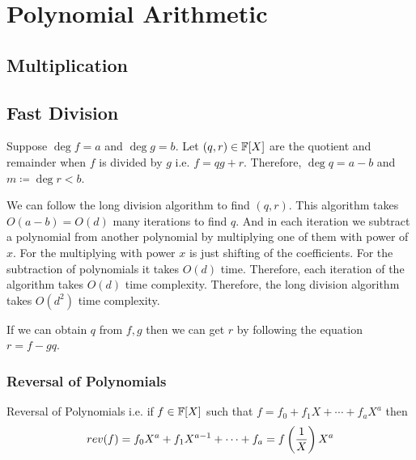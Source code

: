 \chapter{Polynomial Arithmetic}
\section{Multiplication}
\section{Fast Division}
\begin{algoprob}
\end{algoprob}

Suppose $\deg f=a$ and $\deg g=b$. Let $(q,r)\in \mathbb{F}[X]$ are the quotient and remainder when $f$ is divided by $g$ i.e. $f=qg+r$. Therefore, $\deg q=a-b$ and $m\coloneqq \deg r<b$. 

We can follow the long division algorithm to find $(q,r)$. This algorithm takes $O(a-b)=O(d)$ many iterations to find $q$. And in each iteration we subtract a polynomial from another polynomial by multiplying one of them with power of $x$. For the multiplying with power $x$ is just shifting of the coefficients. For the subtraction of polynomials it takes $O(d)$ time. Therefore, each iteration of the algorithm takes $O(d)$ time complexity. Therefore, the long division algorithm takes $O(d^2)$ time complexity. 

If we can obtain $q$ from $f,g$ then we can get $r$ by following the equation $r=f-gq$.  
\subsection{Reversal of Polynomials}
\begin{idea*}
	Reversal of Polynomials i.e. if $f\in \mathbb{F}[X]$ such that $f=f_0+f_1X+\cdots+f_aX^a$ then $$rev(f)=f_0X^a+f_1X^{a-1}+\cdots+f_a=f\left(\frac1X\right)X^a$$
\end{idea*}


